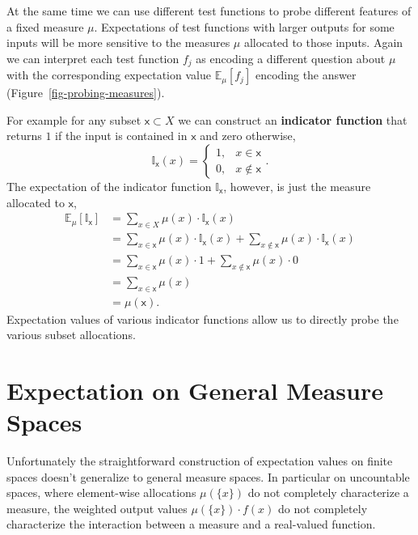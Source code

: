 \documentclass[
  letterpaper,
  DIV=11,
  numbers=noendperiod]{scrartcl}
\begin{document}
At the same time we can use different test functions to probe different
features of a fixed measure \(\mu\). Expectations of test functions with
larger outputs for some inputs will be more sensitive to the measures
\(\mu\) allocated to those inputs. Again we can interpret each test
function \(f_{j}\) as encoding a different question about \(\mu\) with
the corresponding expectation value \(\mathbb{E}_{\mu}[f_{j}]\) encoding
the answer (Figure~\ref{fig-probing-measures}).

For example for any subset \(\mathsf{x} \subset X\) we can construct an
\textbf{indicator function} that returns \(1\) if the input is contained
in \(\mathsf{x}\) and zero otherwise, \[
\mathbb{I}_{\mathsf{x}} (x) =
\left\{
\begin{array}{rr}
1, & x \in \mathsf{x} \\
0, & x \notin \mathsf{x}
\end{array}
\right. .
\] The expectation of the indicator function
\(\mathbb{I}_{\mathsf{x}}\), however, is just the measure allocated to
\(\mathsf{x}\), \begin{align*}
\mathbb{E}_{\mu}[\mathbb{I}_{\mathsf{x}}]
&= \sum_{x \in X} \mu(x) \cdot \mathbb{I}_{\mathsf{x}} (x)
\\
&= \sum_{x \in \mathsf{x}} \mu(x) \cdot \mathbb{I}_{\mathsf{x}} (x)
  + \sum_{x \notin \mathsf{x}} \mu(x) \cdot \mathbb{I}_{\mathsf{x}} (x)
\\
&=  \sum_{x \in \mathsf{x}} \mu(x) \cdot 1
  + \sum_{x \notin \mathsf{x}} \mu(x) \cdot 0
\\
&=  \sum_{x \in \mathsf{x}} \mu(x)
\\
&= \mu( \mathsf{x} ).
\end{align*} Expectation values of various indicator functions allow us
to directly probe the various subset allocations.

\hypertarget{expectation-on-general-measure-spaces}{%
\section{Expectation on General Measure
Spaces}\label{expectation-on-general-measure-spaces}}

Unfortunately the straightforward construction of expectation values on
finite spaces doesn't generalize to general measure spaces. In
particular on uncountable spaces, where element-wise allocations
\(\mu( \{x\} )\) do not completely characterize a measure, the weighted
output values \(\mu( \{ x \} ) \cdot f(x)\) do not completely
characterize the interaction between a measure and a real-valued
function.
\end{document}
